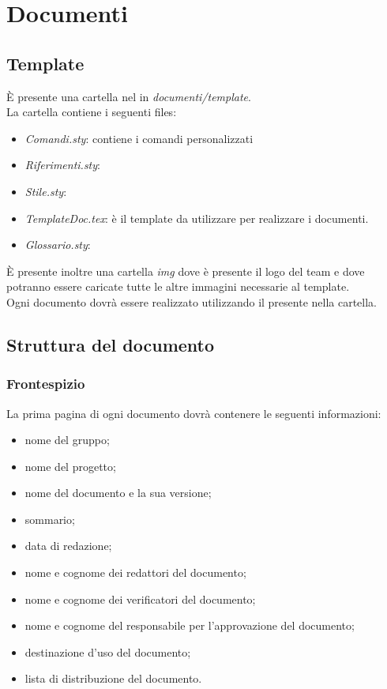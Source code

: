 \section{Documenti}
	\subsection{Template}
		È presente una cartella nel  in \textit{documenti/template}. \\
		La cartella contiene i seguenti files:
		\begin{itemize}
			\item \textit{Comandi.sty}: contiene i comandi personalizzati 
			\item \textit{Riferimenti.sty}: %
			\item \textit{Stile.sty}: %
			\item \textit{TemplateDoc.tex}: è il template da utilizzare per realizzare i documenti.
			\item \textit{Glossario.sty}: %
		\end{itemize}
		È presente inoltre una cartella \textit{img} dove è presente il logo del team e dove potranno essere caricate tutte le altre immagini necessarie al template. \\
		Ogni documento dovrà essere realizzato utilizzando il  presente nella cartella.
	\subsection{Struttura del documento}
		\subsubsection{Frontespizio}
		La prima pagina di ogni documento dovrà contenere le seguenti informazioni:
		\begin{itemize}
			\item nome del gruppo;
			\item nome del progetto;
			\item nome del documento e la sua versione;
			\item sommario;
			\item data di redazione;
			\item nome e cognome dei redattori del documento;
			\item nome e cognome dei verificatori del documento;
			\item nome e cognome del responsabile per l'approvazione del documento;
			\item destinazione d'uso del documento;
			\item lista di distribuzione del documento.
		\end{itemize}

